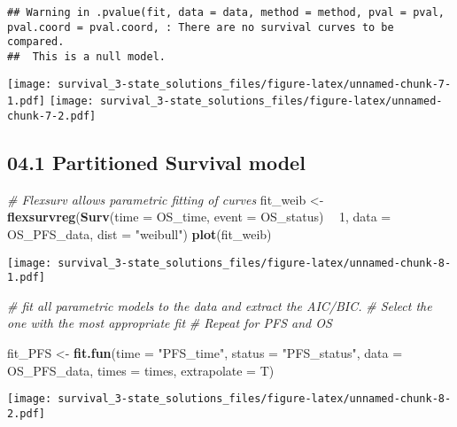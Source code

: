 \documentclass[
]{article}
\newenvironment{Shaded}{\begin{snugshade}}{\end{snugshade}}
\newcommand{\CommentTok}[1]{\textcolor[rgb]{0.56,0.35,0.01}{\textit{#1}}}
\newcommand{\DataTypeTok}[1]{\textcolor[rgb]{0.13,0.29,0.53}{#1}}
\newcommand{\DecValTok}[1]{\textcolor[rgb]{0.00,0.00,0.81}{#1}}
\newcommand{\KeywordTok}[1]{\textcolor[rgb]{0.13,0.29,0.53}{\textbf{#1}}}
\newcommand{\NormalTok}[1]{#1}
\newcommand{\OperatorTok}[1]{\textcolor[rgb]{0.81,0.36,0.00}{\textbf{#1}}}
\newcommand{\StringTok}[1]{\textcolor[rgb]{0.31,0.60,0.02}{#1}}
\begin{document}
\begin{verbatim}
## Warning in .pvalue(fit, data = data, method = method, pval = pval, pval.coord = pval.coord, : There are no survival curves to be compared. 
##  This is a null model.
\end{verbatim}

\texttt{[image: survival\_3-state\_solutions\_files/figure-latex/unnamed-chunk-7-1.pdf]}
\texttt{[image: survival\_3-state\_solutions\_files/figure-latex/unnamed-chunk-7-2.pdf]}

\hypertarget{partitioned-survival-model}{%
\subsection{04.1 Partitioned Survival
model}\label{partitioned-survival-model}}

\begin{Shaded}
\begin{Highlighting}[]
\CommentTok{# Flexsurv allows parametric fitting of curves}
\NormalTok{fit_weib <-}\StringTok{ }\KeywordTok{flexsurvreg}\NormalTok{(}\KeywordTok{Surv}\NormalTok{(}\DataTypeTok{time =}\NormalTok{ OS_time, }\DataTypeTok{event =}\NormalTok{ OS_status) }\OperatorTok{~}\StringTok{ }\DecValTok{1}\NormalTok{, }\DataTypeTok{data =}\NormalTok{ OS_PFS_data,  }\DataTypeTok{dist =} \StringTok{"weibull"}\NormalTok{)}
\KeywordTok{plot}\NormalTok{(fit_weib)}
\end{Highlighting}
\end{Shaded}

\texttt{[image: survival\_3-state\_solutions\_files/figure-latex/unnamed-chunk-8-1.pdf]}

\begin{Shaded}
\begin{Highlighting}[]
\CommentTok{# fit all parametric models to the data and extract the AIC/BIC. }
\CommentTok{# Select the one with the most appropriate fit}
\CommentTok{# Repeat for PFS and OS}




\NormalTok{fit_PFS  <-}\StringTok{ }\KeywordTok{fit.fun}\NormalTok{(}\DataTypeTok{time  =} \StringTok{"PFS_time"}\NormalTok{, }\DataTypeTok{status =} \StringTok{"PFS_status"}\NormalTok{, }\DataTypeTok{data =}\NormalTok{ OS_PFS_data, }
                    \DataTypeTok{times =}\NormalTok{ times, }\DataTypeTok{extrapolate =}\NormalTok{ T) }
\end{Highlighting}
\end{Shaded}

\texttt{[image: survival\_3-state\_solutions\_files/figure-latex/unnamed-chunk-8-2.pdf]}
\end{document}

